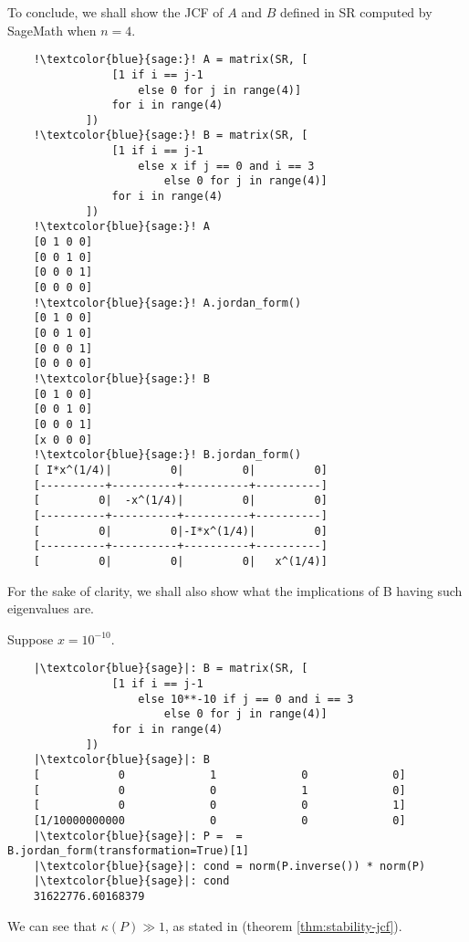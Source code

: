 \begin{example}
To conclude, we shall show the JCF of \(A\) and \(B\) defined in SR computed by SageMath when \(n = 4\).

\begin{verbatim}
    !\textcolor{blue}{sage:}! A = matrix(SR, [
                [1 if i == j-1
                    else 0 for j in range(4)]
                for i in range(4)
            ])
    !\textcolor{blue}{sage:}! B = matrix(SR, [
                [1 if i == j-1
                    else x if j == 0 and i == 3
                        else 0 for j in range(4)]
                for i in range(4)
            ])
    !\textcolor{blue}{sage:}! A
    [0 1 0 0]
    [0 0 1 0]
    [0 0 0 1]
    [0 0 0 0]
    !\textcolor{blue}{sage:}! A.jordan_form()
    [0 1 0 0]
    [0 0 1 0]
    [0 0 0 1]
    [0 0 0 0]
    !\textcolor{blue}{sage:}! B
    [0 1 0 0]
    [0 0 1 0]
    [0 0 0 1]
    [x 0 0 0]
    !\textcolor{blue}{sage:}! B.jordan_form()
    [ I*x^(1/4)|         0|         0|         0]
    [----------+----------+----------+----------]
    [         0|  -x^(1/4)|         0|         0]
    [----------+----------+----------+----------]
    [         0|         0|-I*x^(1/4)|         0]
    [----------+----------+----------+----------]
    [         0|         0|         0|   x^(1/4)]

\end{verbatim}

For the sake of clarity, we shall also show what the implications of B having such eigenvalues are.

Suppose \(x = 10^{-10}\).

\begin{verbatim}
    |\textcolor{blue}{sage}|: B = matrix(SR, [
                [1 if i == j-1
                    else 10**-10 if j == 0 and i == 3
                        else 0 for j in range(4)]
                for i in range(4)
            ])
    |\textcolor{blue}{sage}|: B
    [            0             1             0             0]
    [            0             0             1             0]
    [            0             0             0             1]
    [1/10000000000             0             0             0]
    |\textcolor{blue}{sage}|: P =  = B.jordan_form(transformation=True)[1]
    |\textcolor{blue}{sage}|: cond = norm(P.inverse()) * norm(P)
    |\textcolor{blue}{sage}|: cond
    31622776.60168379
\end{verbatim}
We can see that \(\kappa(P) \gg 1\), as stated in  (theorem \ref{thm:stability-jcf}).

\end{example}